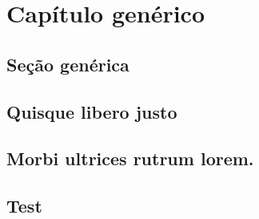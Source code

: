 \documentclass[dissertmst]{ufscar}
\begin{document}
\chapter{Capítulo genérico}

\lipsum[1]

\section{Seção genérica}

\lipsum[3]




\postextual




\begin{apendicesenv}
\partapendices
\chapter{Quisque libero justo}
\lipsum[3]

\end{apendicesenv}

\begin{anexosenv}
   \partanexos
   \chapter{Morbi ultrices rutrum lorem.}
   \lipsum[3]
   \section{Test}
   \lipsum[3]
\end{anexosenv}
\end{document}
